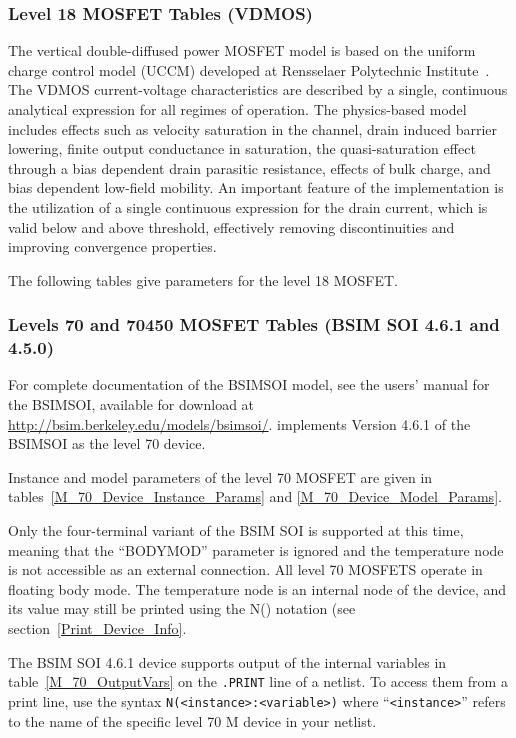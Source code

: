 \subsubsection{Level 18 MOSFET Tables (VDMOS)}
The vertical double-diffused power MOSFET model is based on the uniform charge
control model (UCCM) developed at Rensselaer Polytechnic Institute~\cite{Fjeldly:1998}.
The VDMOS current-voltage characteristics are described by a single, continuous
analytical expression for all regimes of operation.  The physics-based model
includes effects such as velocity saturation in the channel, drain induced barrier
lowering, finite output conductance in saturation, the quasi-saturation effect
through a bias dependent drain parasitic resistance, effects of bulk charge, and
bias dependent low-field mobility.  An important feature of the implementation
is the utilization of a single continuous expression for the drain current, which
is valid below and above threshold, effectively removing discontinuities and
improving convergence properties.

The following tables give parameters for the level 18 MOSFET.




\clearpage
\subsubsection{Levels 70 and 70450 MOSFET Tables (BSIM SOI 4.6.1 and 4.5.0)}
For complete documentation of the BSIMSOI model, see the users' manual
for the BSIMSOI, available for download at
\url{http://bsim.berkeley.edu/models/bsimsoi/}.
\Xyce{} implements Version 4.6.1 of the BSIMSOI as the level 70 device.

Instance and model parameters of the level 70 MOSFET are given in
tables~\ref{M_70_Device_Instance_Params} and
\ref{M_70_Device_Model_Params}.

Only the four-terminal variant of the BSIM SOI is supported at this
time, meaning that the ``BODYMOD'' parameter is ignored and the
temperature node is not accessible as an external connection.  All
level 70 MOSFETS operate in floating body mode.  The temperature node
is an internal node of the device, and its value may still be printed
using the N() notation (see section~\ref{Print_Device_Info}.

The BSIM SOI 4.6.1 device supports output of the internal variables in
table~\ref{M_70_OutputVars} on the \texttt{.PRINT} line of a netlist.
To access them from a print line, use the syntax
\texttt{N(<instance>:<variable>)} where ``\texttt{<instance>}'' refers to the
name of the specific level 70 M device in your netlist.

